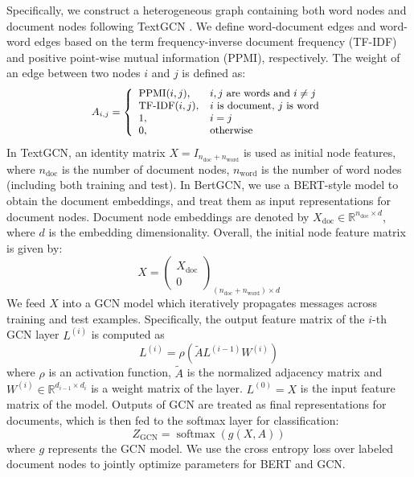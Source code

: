 \documentclass[11pt,a4paper]{article}
\begin{document}
Specifically, we construct a heterogeneous graph containing both word nodes and document nodes following TextGCN \citep{yao2019graph}. We define word-document edges and word-word edges based on the term frequency-inverse document frequency (TF-IDF) and positive point-wise mutual information (PPMI), respectively. The weight of an edge between two nodes $i$ and $j$ is defined as:
\begin{equation}
\small
    \begin{split}
    A_{i,j}= \left \{
        \begin{array}{ll}
            \operatorname{PPMI}(i, j), & i, j\text{ are words and } i \neq j \\
            \operatorname{TF-IDF}(i, j),     & i\text{ is document, }j\text{ is word}\\
            1, & i = j\\
            0, & \text{otherwise}
        \end{array}
    \right.
    \end{split}
    \label{adj_mat}
\end{equation}
In TextGCN, an identity matrix $X = I_{n_\text{doc}+n_\text{word}}$ is used as initial node features, where $n_\text{doc}$ is the number of document nodes, $n_\text{word}$ is the number of word nodes (including both training and test). 
In BertGCN, we use a BERT-style model  to obtain the  document embeddings, and treat them as input representations for document nodes. 
Document node embeddings are denoted by $X_\text{doc}\in\mathbb{R}^{n_\text{doc}\times d}$, where $d$ is the embedding dimensionality.
Overall, the initial node feature matrix is given by:
\begin{equation}
    X= \left (
        \begin{array}{c}
            X_\text{doc}\\
            0
        \end{array}
    \right )_{(n_\text{doc}+n_\text{word})\times d}
\end{equation}
We feed $X$ into a GCN model \citep{kipf2016semi} which iteratively propagates messages across training and test examples. Specifically, the output feature matrix of the $i$-th GCN layer $L^{(i)}$ is computed as
\begin{equation}
    L^{(i)} = \rho(\tilde A L^{(i-1)} W^{(i)})
\end{equation}
where $\rho$ is an activation function, $\tilde A$ is the normalized adjacency matrix and $W^{(i)}\in \mathbb{R}^{d_{i-1}\times d_i}$ is a weight matrix of the layer. $L^{(0)}=X$ is the input feature matrix of the model.
Outputs of GCN are treated as final representations for documents, which is then fed to the softmax layer for classification:
\begin{equation}
Z_\text{GCN} = \operatorname{softmax}(g(X, A))
\label{gcn}
\end{equation}
where $g$ represents the GCN model. 
We use the cross entropy loss over labeled document nodes to jointly optimize parameters for BERT and GCN.
\end{document}
